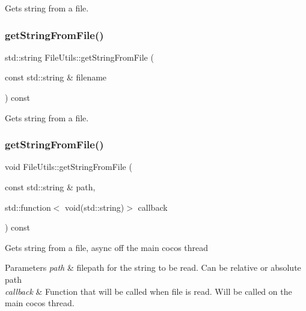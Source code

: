 Gets string from a file. \mbox{\label{classFileUtils_a72a478f88775c6de04114c396971285e}} 
\subsubsection{\texorpdfstring{get\+String\+From\+File()}{getStringFromFile()}\hspace{0.1cm}{\footnotesize\ttfamily [2/3]}}
{\footnotesize\ttfamily std\+::string File\+Utils\+::get\+String\+From\+File (\begin{DoxyParamCaption}\item[{const std\+::string \&}]{filename }\end{DoxyParamCaption}) const\hspace{0.3cm}{\ttfamily [virtual]}}

Gets string from a file. \mbox{\label{classFileUtils_a510afb98fe877771b610e9cbad94849a}} 
\subsubsection{\texorpdfstring{get\+String\+From\+File()}{getStringFromFile()}\hspace{0.1cm}{\footnotesize\ttfamily [3/3]}}
{\footnotesize\ttfamily void File\+Utils\+::get\+String\+From\+File (\begin{DoxyParamCaption}\item[{const std\+::string \&}]{path,  }\item[{std\+::function$<$ void(std\+::string)$>$}]{callback }\end{DoxyParamCaption}) const\hspace{0.3cm}{\ttfamily [virtual]}}

Gets string from a file, async off the main cocos thread


\begin{DoxyParams}{Parameters}
{\em path} & filepath for the string to be read. Can be relative or absolute path \\
\hline
{\em callback} & Function that will be called when file is read. Will be called on the main cocos thread. \\
\hline
\end{DoxyParams}
\mbox{\label{classFileUtils_a318996e1e3cc1ff7463dea9159d7e7be}} 
